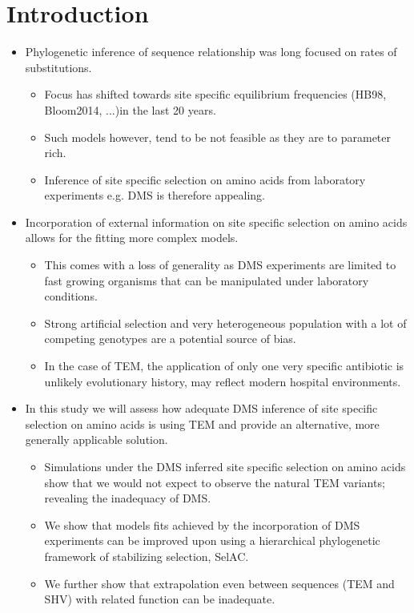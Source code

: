 \documentclass[12pt]{article}
\begin{document}
\section*{Introduction}
\begin{itemize}
 \item Phylogenetic inference of sequence relationship was long focused on rates of substitutions.
 \begin{itemize}
  \item Focus has shifted towards site specific equilibrium frequencies (HB98, Bloom2014, ...)in the last 20 years.
  \item Such models however, tend to be not feasible as they are to parameter rich.
  \item Inference of site specific selection on amino acids from laboratory experiments e.g. DMS is therefore appealing.
 \end{itemize}
 \item Incorporation of external information on site specific selection on amino acids allows for the fitting more complex models.
  \begin{itemize}
   \item This comes with a loss of generality as DMS experiments are limited to fast growing organisms that can be manipulated under laboratory conditions.
   \item Strong artificial selection and very heterogeneous population with a lot of competing genotypes are a potential source of bias.
   \item In the case of TEM, the application of only one very specific antibiotic is unlikely evolutionary history, may reflect modern hospital environments.
  \end{itemize}
 \item In this study we will assess how adequate DMS inference of site specific selection on amino acids is using TEM and provide an alternative, more generally applicable solution.
 \begin{itemize}
  \item Simulations under the DMS inferred site specific selection on amino acids show that we would not expect to observe the natural TEM variants; revealing the inadequacy of DMS.
  \item We show that models fits achieved by the incorporation of DMS experiments can be improved upon using a hierarchical phylogenetic framework of stabilizing selection, SelAC.
  \item We further show that extrapolation even between sequences (TEM and SHV) with related function can be inadequate.
 \end{itemize}
\end{itemize}
\end{document}
